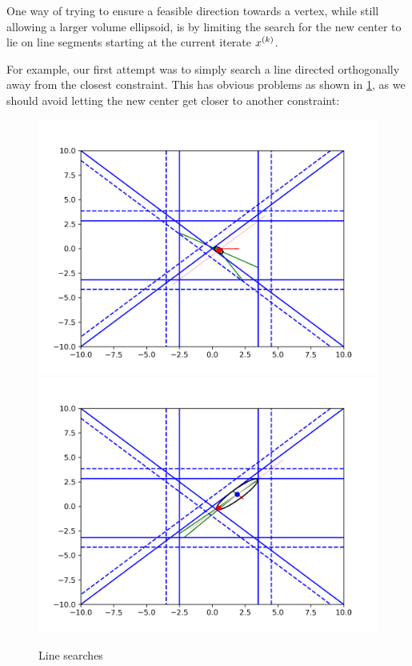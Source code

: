 One way of trying to ensure a feasible direction towards a vertex, while still allowing a larger volume ellipsoid, is by limiting the search for the new center to lie on line segments starting at the current iterate $x^{(k)}$.

For example, our first attempt was to simply search a line directed orthogonally away from the closest constraint.
This has obvious problems as shown in \cref{first_line_search}, as we should avoid letting the new center get closer to another constraint:

\begin{figure}[ht]
    \centering
    \includegraphics[scale=0.4]{images/line_1.png}
    \includegraphics[scale=0.4]{images/line_2.png}
    \caption{Line searches}
    \label{first_line_search}
\end{figure}


